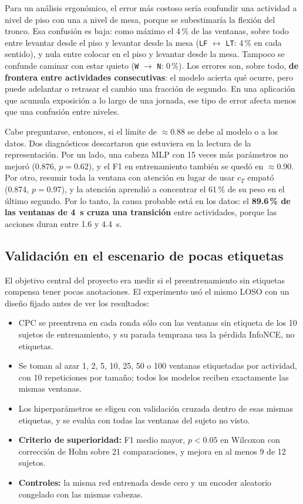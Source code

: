 \documentclass[letterpaper,11pt]{article}
\newcommand{\act}[1]{\texttt{#1}}
\begin{document}
Para un análisis ergonómico, el error más costoso sería confundir una actividad a nivel de piso con una a nivel de mesa, porque se subestimaría la flexión del tronco. Esa confusión es baja: como máximo el 4\,\% de las ventanas, sobre todo entre levantar desde el piso y levantar desde la mesa (\act{LF} $\leftrightarrow$ \act{LT}: 4\,\% en cada sentido), y nula entre colocar en el piso y levantar desde la mesa. Tampoco se confunde caminar con estar quieto (\act{W} $\to$ \act{N}: 0\,\%). Los errores son, sobre todo, \textbf{de frontera entre actividades consecutivas}: el modelo acierta qué ocurre, pero puede adelantar o retrasar el cambio una fracción de segundo. En una aplicación que acumula exposición a lo largo de una jornada, ese tipo de error afecta menos que una confusión entre niveles.

Cabe preguntarse, entonces, si el límite de $\approx 0.88$ se debe al modelo o a los datos. Dos diagnósticos descartaron que estuviera en la lectura de la representación. Por un lado, una cabeza MLP con 15 veces más parámetros no mejoró (0.876, $p = 0.62$), y el F1 en entrenamiento también se quedó en $\approx 0.90$. Por otro, resumir toda la ventana con atención en lugar de usar $c_T$ empató (0.874, $p = 0.97$), y la atención aprendió a concentrar el 61\,\% de su peso en el último segundo. Por lo tanto, la causa probable está en los datos: el \textbf{89.6\,\% de las ventanas de 4~s cruza una transición} entre actividades, porque las acciones duran entre 1.6 y 4.4~s.

\subsection{Validación en el escenario de pocas etiquetas}
\label{sec:pocas}
El objetivo central del proyecto era medir si el preentrenamiento sin etiquetas compensa tener pocas anotaciones. El experimento usó el mismo LOSO con un diseño fijado antes de ver los resultados:

\begin{itemize}
  \item CPC se preentrena en cada ronda sólo con las ventanas sin etiqueta de los 10 sujetos de entrenamiento, y su parada temprana usa la pérdida InfoNCE, no etiquetas.
  \item Se toman al azar 1, 2, 5, 10, 25, 50 o 100 ventanas etiquetadas por actividad, con 10 repeticiones por tamaño; todos los modelos reciben exactamente las mismas ventanas.
  \item Los hiperparámetros se eligen con validación cruzada dentro de esas mismas etiquetas, y se evalúa con todas las ventanas del sujeto no visto.
  \item \textbf{Criterio de superioridad:} F1 medio mayor, $p < 0.05$ en Wilcoxon con corrección de Holm sobre 21 comparaciones, y mejora en al menos 9 de 12 sujetos.
  \item \textbf{Controles:} la misma red entrenada desde cero y un encoder aleatorio congelado con las mismas cabezas.
\end{itemize}
\end{document}
